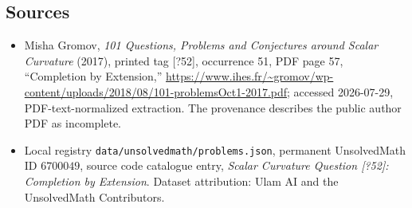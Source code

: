 \documentclass[11pt]{article}
\begin{document}
\subsection{Sources}
\begin{itemize}
\item Misha Gromov, \emph{101 Questions, Problems and Conjectures around Scalar Curvature} (2017), printed tag [?52], occurrence 51, PDF page 57, ``Completion by Extension,'' \url{https://www.ihes.fr/~gromov/wp-content/uploads/2018/08/101-problemsOct1-2017.pdf}; accessed 2026-07-29, PDF-text-normalized extraction. The provenance describes the public author PDF as incomplete.
\item Local registry \texttt{data/unsolvedmath/problems.json}, permanent UnsolvedMath ID $6700049$, source code catalogue entry, \emph{Scalar Curvature Question [?52]: Completion by Extension}. Dataset attribution: Ulam AI and the UnsolvedMath Contributors.
\end{itemize}
\end{document}
